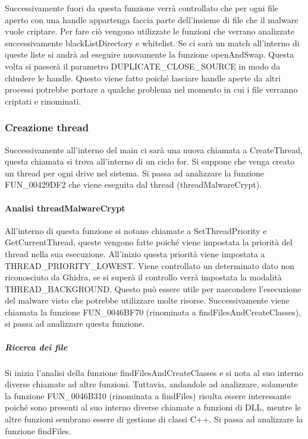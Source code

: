 \documentclass[a4paper,12pt]{article}
\begin{document}
Successivamente fuori da questa funzione verrà controllato che per ogni file aperto con una handle appartenga faccia parte dell'insieme di file che il malware vuole criptare. Per fare ciò vengono utilizzate le funzioni che verrano analizzate successivamente blackListDirectory e whitelist. Se ci sarà un match all'interno di queste liste si andrà ad eseguire nuovamente la funzione openAndSwap. Questa volta si passerà il parametro DUPLICATE\_CLOSE\_SOURCE in modo da chiudere le handle. Questo viene fatto poiché lasciare handle aperte da altri processi potrebbe portare a qualche problema nel momento in cui i file verranno criptati e rinominati.

\subsubsection{Creazione thread }
Successivamente all'interno del main ci sarà una nuova chiamata a CreateThread, questa chiamata si trova all'interno di un ciclo for. Si suppone che venga creato un thread per ogni drive nel sistema. Si passa ad analizzare la funzione FUN\_00429DF2 che viene eseguita dal thread (threadMalwareCrypt). 

\paragraph{Analisi threadMalwareCrypt}
All'interno di questa funzione si notano chiamate a SetThreadPriority e GetCurrentThread, queste vengono fatte poiché viene impostata la priorità del thread nella sua esecuzione. All'inizio questa priorità viene impostata a THREAD\_PRIORITY\_LOWEST. Viene controllato un determinato dato non riconosciuto da Ghidra, se si superà il controllo verrà impostata la modalità THREAD\_BACKGROUND. Questo può essere utile per nascondere l'esecuzione del malware visto che potrebbe utilizzare molte risorse. Successivamente viene chiamata la funzione FUN\_0046BF70 (rinominata a findFilesAndCreateClasses), si passa ad analizzare questa funzione.

\subparagraph{Ricerca dei file}
Si inizia l'analisi della funzione findFilesAndCreateClasses e si nota al suo interno diverse chiamate ad altre funzioni. Tuttavia, andandole ad analizzare, solamente la funzione FUN\_0046B310 (rinominata a findFiles) risulta essere interessante poiché sono presenti al suo interno diverse chiamate a funzioni di DLL, mentre le altre funzioni sembrano essere di gestione di classi C++. Si passa ad analizzare la funzione findFiles.
\end{document}
